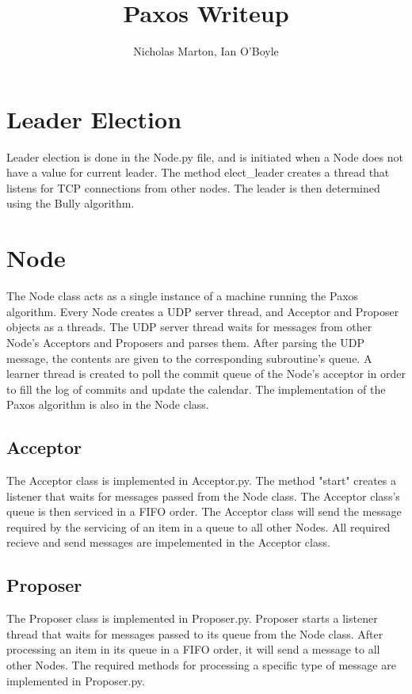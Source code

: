 \documentclass{article}
\begin{document}
	
	\title{Paxos Writeup}
	\author{Nicholas Marton, Ian O'Boyle}
	
	\maketitle
	
	\section{Leader Election}
		Leader election is done in the Node.py file, and is initiated when a Node does not have a value for current leader. The method elect\_leader creates a thread that listens for TCP connections from other nodes. The leader is then determined using the Bully algorithm. 
	\section{Node}
		The Node class acts as a single instance of a machine running the Paxos algorithm. Every Node creates a UDP server thread, and Acceptor and Proposer objects as a threads.
		The UDP server thread waits for messages from other Node's Acceptors and Proposers and parses them. After parsing the UDP message, the contents are given to the corresponding subroutine's queue. A learner thread is created to poll the commit queue of the Node's acceptor in order to fill the log of commits and update the calendar.  The implementation of the Paxos algorithm is also in the Node class. 
	\subsection{Acceptor}
		The Acceptor class is implemented in Acceptor.py. The method "start" creates a listener that waits for messages passed from the Node class. The Acceptor class's queue is then serviced in a FIFO order. The Acceptor class will send the message required by the servicing of an item in a queue to all other Nodes. All required recieve and send messages are impelemented in the Acceptor class.
	\subsection{Proposer}
		The Proposer class is implemented in Proposer.py. Proposer starts a listener thread that waits for messages passed to its queue from the Node class. After processing an item in its queue in a FIFO order, it will send a message to all other Nodes. The required methods for processing a specific type of message are implemented in Proposer.py.
\end{document}
